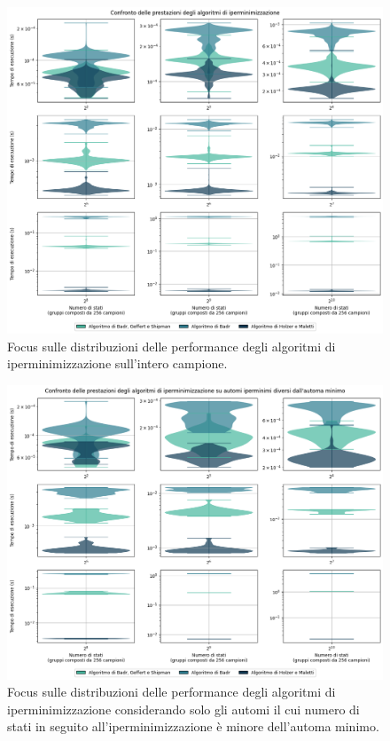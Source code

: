 \documentclass[a4paper,12pt]{report} %
\begin{document}
\begin{figure}[!htb]
  \centering
  \includegraphics[width=1\linewidth]{images/performance_violin_focus_all.png}
  \caption{\label{fig:dfa-pcomparison-violin-focus-all}Focus sulle distribuzioni delle performance degli algoritmi
  di iperminimizzazione sull'intero campione.}
\end{figure}

\begin{figure}[!htb]
  \centering
  \includegraphics[width=1\linewidth]{images/performance_violin_focus_only.png}
  \caption{\label{fig:dfa-pcomparison-violin-focus-only}Focus sulle distribuzioni delle performance degli algoritmi
  di iperminimizzazione considerando solo gli automi il cui numero di stati in seguito all'iperminimizzazione
  è minore dell'automa minimo.}
\end{figure}



\printbibheading
\printbibliography[filter=papers,heading=subbibliography,title={Pubblicazioni}]
\printbibliography[type=book,heading=subbibliography,title={Testi}]
\printbibliography[type=software,heading=subbibliography,title={Software}]
\end{document}

